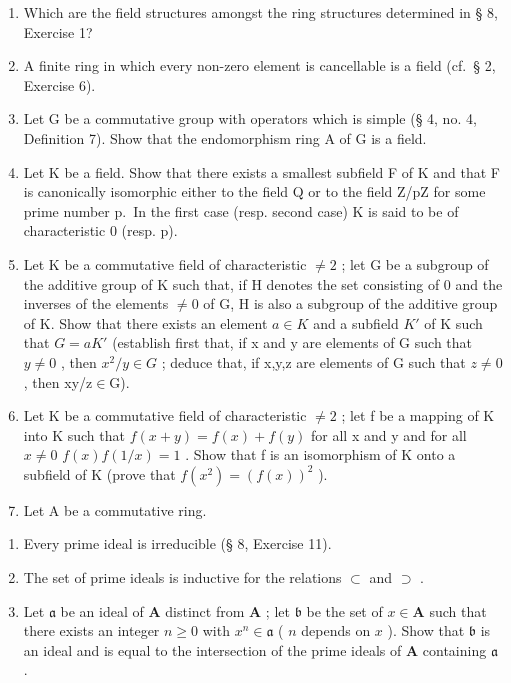 \BourbakiExercisesSection

\begin{enumerate}
\def\labelenumi{\arabic{enumi}.}
\item
  Which are the field structures amongst the ring structures determined in § 8, Exercise 1?
\item
  A finite ring in which every non-zero element is cancellable is a field (cf.~§ 2, Exercise 6).
\item
  Let G be a commutative group with operators which is simple (§ 4, no. 4, Definition 7). Show that the endomorphism ring A of G is a field.
\item
  Let K be a field. Show that there exists a smallest subfield F of K and that F is canonically isomorphic either to the field Q or to the field Z/pZ for some prime number p.~In the first case (resp. second case) K is said to be of characteristic 0 (resp. p).
\item
  Let K be a commutative field of characteristic \(\neq2\) ; let G be a subgroup of the additive group of K such that, if H denotes the set consisting of 0 and the inverses of the elements \(\neq0\) of G, H is also a subgroup of the additive group of K. Show that there exists an element \(a\in K\) and a subfield \(K'\) of K such that \(G=aK'\) (establish first that, if x and y are elements of G such that \(y\neq0\) , then \(x^{2}/y\in G\) ; deduce that, if x,y,z are elements of G such that \(z\neq0\) , then xy/z\ensuremath{\in}G).
\item
  Let K be a commutative field of characteristic \(\neq2\) ; let f be a mapping of K into K such that \(f(x+y)=f(x)+f(y)\) for all x and y and for all \(x\neq0\) \(f(x)f(1/x)=1\) . Show that f is an isomorphism of K onto a subfield of K (prove that \(f(x^{2})=(f(x))^{2}\) ).
\item
  Let A be a commutative ring.
\end{enumerate}

\begin{enumerate}
\def\labelenumi{(\alph{enumi})}
\item
  Every prime ideal is irreducible (§ 8, Exercise 11).
\item
  The set of prime ideals is inductive for the relations \(\subset\) and \(\supset\) .
\item
  Let \(\mathfrak{a}\) be an ideal of \(\mathbf{A}\) distinct from \(\mathbf{A}\) ; let \(\mathfrak{b}\) be the set of \(x \in \mathbf{A}\) such that there exists an integer \(n \geqslant 0\) with \(x^n \in \mathfrak{a}\) ( \(n\) depends on \(x\) ). Show that \(\mathfrak{b}\) is an ideal and is equal to the intersection of the prime ideals of \(\mathbf{A}\) containing \(\mathfrak{a}\) .
\end{enumerate}

